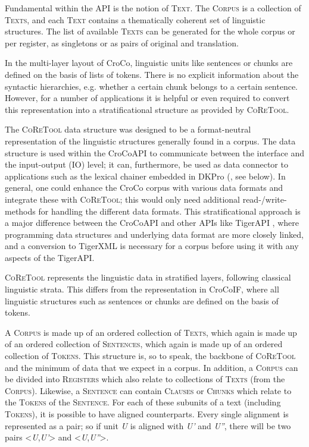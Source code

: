 \documentclass[output=paper]{LSP/langsci}
\begin{document}
Fundamental within the API is the notion of \textsc{Text}. The \textsc{Corpus} is a collection of \textsc{Texts}, and each \textsc{Text} contains a thematically coherent set of linguistic structures. The list of available \textsc{Texts} can be generated for the whole corpus or per register, as singletons or as pairs of original and translation.

In the multi-layer layout of CroCo, linguistic units like sentences or chunks are defined on the basis of lists of tokens. There is no explicit information about the syntactic hierarchies, e.g. whether a certain chunk belongs to a certain sentence. However, for a number of applications it is helpful or even required to convert this representation into a stratificational structure as provided by \textsc{CoReTool.}

The \textsc{CoReTool} data structure was designed to be a format-neutral representation of the linguistic structures generally found in a corpus. The data structure is used within the CroCoAPI to communicate between the interface and the input-output (IO) level; it can, furthermore, be used as data connector to applications such as the lexical chainer embedded in DKPro (\citealt{GurevychEtAl2007}, see below). In general, one could enhance the CroCo corpus with various data formats and integrate these with \textsc{CoReTool}; this would only need additional read-/write-methods for handling the different data formats. This stratificational approach is a major difference between the CroCoAPI and other APIs like TigerAPI \citep{Özgür2007}, where programming data structures and underlying data format are more closely linked, and a conversion to TigerXML is necessary for a corpus before using it with any aspects of the TigerAPI.

\textsc{CoReTool} represents the linguistic data in stratified layers, following classical linguistic strata. This differs from the representation in CroCoIF, where all linguistic structures such as sentences or chunks are defined on the basis of tokens. 

A \textsc{Corpus} is made up of an ordered collection of \textsc{Texts}, which again is made up of an ordered collection of \textsc{Sentences}, which again is made up of an ordered collection of \textsc{Tokens}. This structure is, so to speak, the backbone of \textsc{CoReTool} and the minimum of data that we expect in a corpus. In addition, a \textsc{Corpus} can be divided into \textsc{Registers} which also relate to collections of \textsc{Texts} (from the \textsc{Corpus}). Likewise, a \textsc{Sentence} can contain \textsc{Clauses} or \textsc{Chunks} which relate to the \textsc{Tokens} of the \textsc{Sentence}. For each of these subunits of a text (including \textsc{Tokens}), it is possible to have aligned counterparts. Every single alignment is represented as a pair; so if unit \textit{U} is aligned with \textit{U'} and \textit{U''}, there will be two pairs <\textit{U},\textit{U'}> and <\textit{U},\textit{U''}>.
\end{document}
